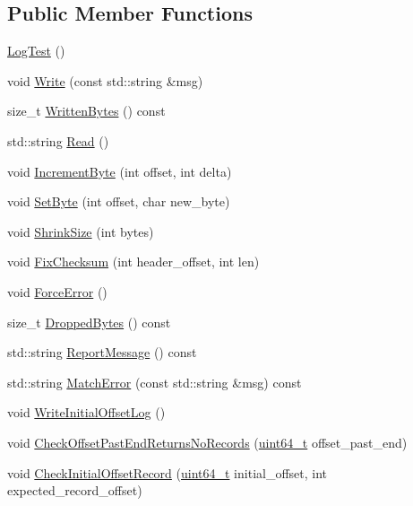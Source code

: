 \subsection*{Public Member Functions}
\begin{DoxyCompactItemize}
\item 
\hyperlink{classleveldb_1_1log_1_1_log_test_a71c5f0a5a098ca82a72e7065141a1d06}{Log\-Test} ()
\item 
void \hyperlink{classleveldb_1_1log_1_1_log_test_ab8af1c9335e7fbb42e06a6c01de2d0fc}{Write} (const std\-::string \&msg)
\item 
size\-\_\-t \hyperlink{classleveldb_1_1log_1_1_log_test_ad14bacbd6c103ac692bbb019ce9071a3}{Written\-Bytes} () const 
\item 
std\-::string \hyperlink{classleveldb_1_1log_1_1_log_test_a2f5deb8b04200600ac0bc7cd3e39bd57}{Read} ()
\item 
void \hyperlink{classleveldb_1_1log_1_1_log_test_aee52d93f17cf3e23b2ae11bd9a5f5652}{Increment\-Byte} (int offset, int delta)
\item 
void \hyperlink{classleveldb_1_1log_1_1_log_test_a2f3545c3cd495bb60b4322fa045b897c}{Set\-Byte} (int offset, char new\-\_\-byte)
\item 
void \hyperlink{classleveldb_1_1log_1_1_log_test_a2f19ddba7e239badc63920c6fb496823}{Shrink\-Size} (int bytes)
\item 
void \hyperlink{classleveldb_1_1log_1_1_log_test_ac966525faded349590f1a1ae738844cf}{Fix\-Checksum} (int header\-\_\-offset, int len)
\item 
void \hyperlink{classleveldb_1_1log_1_1_log_test_a817eeeba2beef1d81dac83badb9f1049}{Force\-Error} ()
\item 
size\-\_\-t \hyperlink{classleveldb_1_1log_1_1_log_test_afe6bc4454267707f11cd0441aeca3faf}{Dropped\-Bytes} () const 
\item 
std\-::string \hyperlink{classleveldb_1_1log_1_1_log_test_af7c61c3c2dfb9ac02a1e7b9f541fba6a}{Report\-Message} () const 
\item 
std\-::string \hyperlink{classleveldb_1_1log_1_1_log_test_a7f03fc33e830faea8090dd1aac148219}{Match\-Error} (const std\-::string \&msg) const 
\item 
void \hyperlink{classleveldb_1_1log_1_1_log_test_af0053e30c5ccaa5e2e10d595a4f48565}{Write\-Initial\-Offset\-Log} ()
\item 
void \hyperlink{classleveldb_1_1log_1_1_log_test_a2bf9cdf3b3f722c300f65a7752c0e101}{Check\-Offset\-Past\-End\-Returns\-No\-Records} (\hyperlink{stdint_8h_aaa5d1cd013383c889537491c3cfd9aad}{uint64\-\_\-t} offset\-\_\-past\-\_\-end)
\item 
void \hyperlink{classleveldb_1_1log_1_1_log_test_ab9ca8c2014e78611d66d884f7b46e4ff}{Check\-Initial\-Offset\-Record} (\hyperlink{stdint_8h_aaa5d1cd013383c889537491c3cfd9aad}{uint64\-\_\-t} initial\-\_\-offset, int expected\-\_\-record\-\_\-offset)
\end{DoxyCompactItemize}
